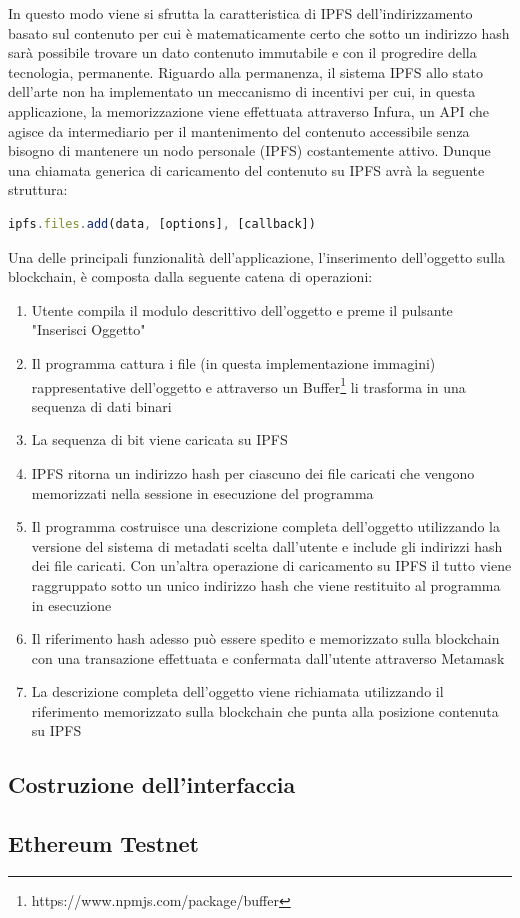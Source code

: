 In questo modo viene si sfrutta la caratteristica di IPFS dell'indirizzamento basato sul contenuto per cui è matematicamente certo che sotto un indirizzo hash sarà possibile trovare un dato contenuto immutabile e con il progredire della tecnologia, permanente. Riguardo alla permanenza, il sistema IPFS allo stato dell'arte non ha implementato un meccanismo di incentivi per cui, in questa applicazione, la memorizzazione viene effettuata attraverso Infura, un API che agisce da intermediario per il mantenimento del contenuto accessibile senza bisogno di mantenere un nodo personale (IPFS) costantemente attivo. Dunque una chiamata generica di caricamento del contenuto su IPFS avrà la seguente struttura:
\\
\begin{lstlisting}[caption={Aggiunta di file con IPFS Javascript API},language=JavaScript]
ipfs.files.add(data, [options], [callback])
\end{lstlisting}

Una delle principali funzionalità dell'applicazione, l'inserimento dell'oggetto sulla blockchain, è composta dalla seguente catena di operazioni:

\begin{enumerate}
    \item Utente compila il modulo descrittivo dell'oggetto e preme il pulsante "Inserisci Oggetto"
    \item Il programma cattura i file (in questa implementazione immagini) rappresentative dell'oggetto e attraverso un Buffer\footnote{https://www.npmjs.com/package/buffer} li trasforma in una sequenza di dati binari
    \item La sequenza di bit viene caricata su IPFS
    \item IPFS ritorna un indirizzo hash per ciascuno dei file caricati che vengono memorizzati nella sessione in esecuzione del programma
    \item Il programma costruisce una descrizione completa dell'oggetto utilizzando la versione del sistema di metadati scelta dall'utente e include gli indirizzi hash dei file caricati. Con un’altra operazione di caricamento su IPFS il tutto viene raggruppato sotto un unico indirizzo hash che viene restituito al programma in esecuzione
    \item Il riferimento hash adesso può essere spedito e memorizzato sulla blockchain con una transazione effettuata e confermata dall'utente attraverso Metamask
    \item La descrizione completa dell'oggetto viene richiamata utilizzando il riferimento memorizzato sulla blockchain che punta alla posizione contenuta su IPFS
\end{enumerate}


\subsection{Costruzione dell'interfaccia}

\subsection{Ethereum Testnet}



